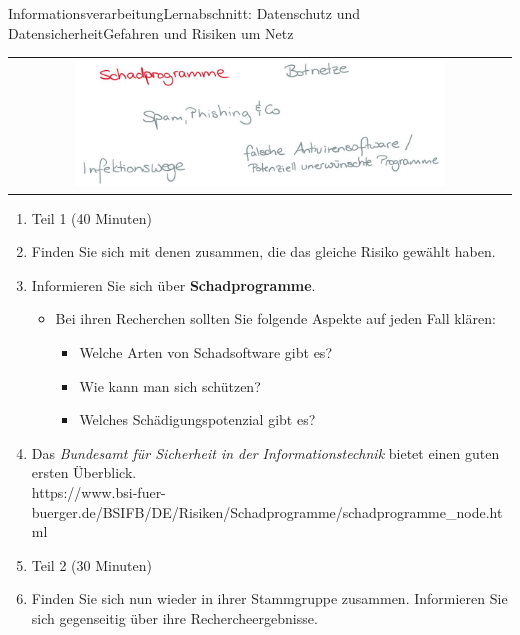 \documentclass[oneside,openany,headings=optiontotoc,11pt,numbers=noenddot]{scrreprt}
\begin{document}
\begin{worksheet}{Informationsverarbeitung}{Lernabschnitt: Datenschutz und Datensicherheit}{Gefahren und Risiken um Netz}
		\newpage
		\setcounter{page}{1}
		\begin{framed}
			\begin{tabular}{lcr}
				& \includegraphics[width=0.8\textwidth]{../99_Bilder/Schadprogramme.jpg} & \\
			\end{tabular}
		\end{framed}
		\begin{enumerate}[label=(\Roman*.)]
			\item[] \color{gray}Teil 1 (40 Minuten)\normalcolor
			\item Finden Sie sich mit denen zusammen, die das gleiche Risiko gewählt haben.
			\item Informieren Sie sich über \textbf{Schadprogramme}.
			\begin{itemize}
				\item[] Bei ihren Recherchen sollten Sie folgende Aspekte auf jeden Fall klären:
				\begin{itemize}[label=+]
					\item Welche Arten von Schadsoftware gibt es?
					\item Wie kann man sich schützen?
					\item Welches Schädigungspotenzial gibt es?
				\end{itemize}
			\end{itemize}
			\item[] Das \textit{Bundesamt für Sicherheit in der Informationstechnik} bietet einen guten ersten Überblick.\\
			\small{\color{codegray}https://www.bsi-fuer-buerger.de/BSIFB/DE/Risiken/Schadprogramme/schadprogramme\_node.html}
			\normalsize
			\item[] \color{gray}Teil 2 (30 Minuten)\normalcolor
			\item Finden Sie sich nun wieder in ihrer Stammgruppe zusammen. Informieren Sie sich gegenseitig über ihre Rechercheergebnisse.
		\end{enumerate}
	

\end{worksheet}
\end{document}

